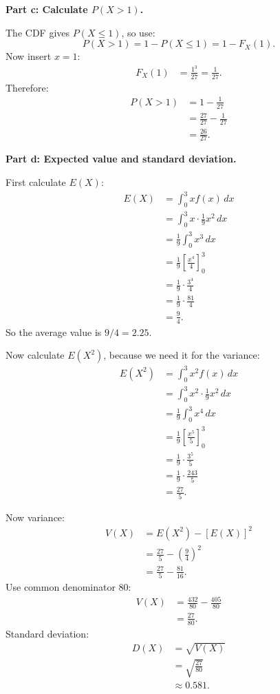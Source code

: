 \documentclass[11pt,a4paper]{article}
\begin{document}
\textbf{Part c: Calculate \(P(X>1)\).}

The CDF gives \(P(X\le 1)\), so use:
\[
P(X>1)=1-P(X\le 1)=1-F_X(1).
\]
Now insert \(x=1\):
\begin{align*}
F_X(1)&=\frac{1^3}{27}=\frac{1}{27}.
\end{align*}
Therefore:
\begin{align*}
P(X>1)
&=1-\frac{1}{27}\\
&=\frac{27}{27}-\frac{1}{27}\\
&=\frac{26}{27}.
\end{align*}

\textbf{Part d: Expected value and standard deviation.}

First calculate \(E(X)\):
\begin{align*}
E(X)
&=\int_0^3 x f(x)\,dx\\
&=\int_0^3 x\cdot \frac{1}{9}x^2\,dx\\
&=\frac{1}{9}\int_0^3 x^3\,dx\\
&=\frac{1}{9}\left[\frac{x^4}{4}\right]_0^3\\
&=\frac{1}{9}\cdot \frac{3^4}{4}\\
&=\frac{1}{9}\cdot \frac{81}{4}\\
&=\frac{9}{4}.
\end{align*}
So the average value is \(9/4=2.25\).

Now calculate \(E(X^2)\), because we need it for the variance:
\begin{align*}
E(X^2)
&=\int_0^3 x^2 f(x)\,dx\\
&=\int_0^3 x^2\cdot \frac{1}{9}x^2\,dx\\
&=\frac{1}{9}\int_0^3 x^4\,dx\\
&=\frac{1}{9}\left[\frac{x^5}{5}\right]_0^3\\
&=\frac{1}{9}\cdot \frac{3^5}{5}\\
&=\frac{1}{9}\cdot \frac{243}{5}\\
&=\frac{27}{5}.
\end{align*}

Now variance:
\begin{align*}
V(X)
&=E(X^2)-[E(X)]^2\\
&=\frac{27}{5}-\left(\frac{9}{4}\right)^2\\
&=\frac{27}{5}-\frac{81}{16}.
\end{align*}
Use common denominator \(80\):
\begin{align*}
V(X)
&=\frac{432}{80}-\frac{405}{80}\\
&=\frac{27}{80}.
\end{align*}
Standard deviation:
\begin{align*}
D(X)
&=\sqrt{V(X)}\\
&=\sqrt{\frac{27}{80}}\\
&\approx 0.581.
\end{align*}
\end{document}
